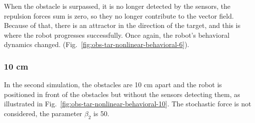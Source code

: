 When the obstacle is surpassed, it is no longer detected by the sensors, the
repulsion forces sum is zero, so they no longer contribute to the vector
field. Because of that, there is an attractor in the direction of the target,
and this is where the robot progresses successfully. Once again, the robot's
behavioral dynamics changed.
(Fig.~\ref{fig:obs-tar-nonlinear-behavioral-6}). 

\subsubsection{10 cm}%
\label{sec:Different-gaps-10cm}
In the second simulation, the obstacles are 10 cm apart and the robot is
positioned in front of the obstacles but without the sensors detecting them, as
illustrated in Fig.~\ref{fig:obs-tar-nonlinear-behavioral-10}. 
The stochastic force is not considered, the parameter $\beta _{2}$ is 50.
%
